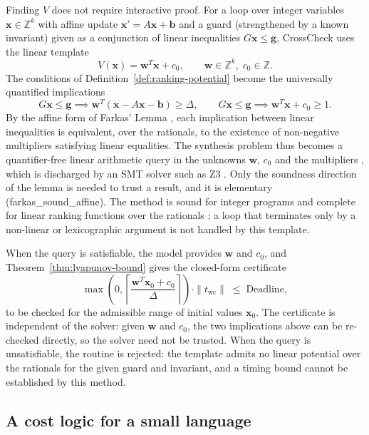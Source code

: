 \documentclass[oneside,english]{amsart}
\numberwithin{equation}{section}
\numberwithin{figure}{section}
\theoremstyle{plain}
\theoremstyle{definition}
\theoremstyle{plain}
\theoremstyle{remark}
\theoremstyle{plain}
\theoremstyle{definition}
\theoremstyle{plain}
\theoremstyle{remark}
\newcommand{\lean}[1]{{\ttfamily\small #1}}
\begin{document}
Finding $V$ does not require interactive proof. For a loop over integer variables $\mathbf{x} \in \mathbb{Z}^k$ with affine update $\mathbf{x}' = A\mathbf{x} + \mathbf{b}$ and a guard (strengthened by a known invariant) given as a conjunction of linear inequalities $G\mathbf{x} \le \mathbf{g}$, CrossCheck uses the linear template
\[
V(\mathbf{x}) = \mathbf{w}^T \mathbf{x} + c_0, \qquad \mathbf{w} \in \mathbb{Z}^k, \; c_0 \in \mathbb{Z}.
\]
The conditions of Definition~\ref{def:ranking-potential} become the universally quantified implications
\[
G\mathbf{x} \le \mathbf{g} \implies \mathbf{w}^T (\mathbf{x} - A\mathbf{x} - \mathbf{b}) \ge \Delta, \qquad G\mathbf{x} \le \mathbf{g} \implies \mathbf{w}^T \mathbf{x} + c_0 \ge 1 .
\]
By the affine form of Farkas' Lemma \cite{schrijver1986theory}, each implication between linear inequalities is equivalent, over the rationals, to the existence of non-negative multipliers satisfying linear equalities. The synthesis problem thus becomes a quantifier-free linear arithmetic query in the unknowns $\mathbf{w}$, $c_0$ and the multipliers \cite{colon2001synthesis,podelski2004complete}, which is discharged by an SMT solver such as Z3 \cite{demoura2008z3}. Only the soundness direction of the lemma is needed to trust a result, and it is elementary (\lean{farkas\_\allowbreak sound\_\allowbreak affine}). The method is sound for integer programs and complete for linear ranking functions over the rationals \cite{benamram2014ranking}; a loop that terminates only by a non-linear or lexicographic argument is not handled by this template.

When the query is satisfiable, the model provides $\mathbf{w}$ and $c_0$, and Theorem~\ref{thm:lyapunov-bound} gives the closed-form certificate
\[
\max\left(0, \left\lceil \frac{\mathbf{w}^T \mathbf{x}_0 + c_0}{\Delta} \right\rceil\right) \cdot \|t_{\text{wc}}\| \;\le\; \text{Deadline},
\]
to be checked for the admissible range of initial values $\mathbf{x}_0$. The certificate is independent of the solver: given $\mathbf{w}$ and $c_0$, the two implications above can be re-checked directly, so the solver need not be trusted. When the query is unsatisfiable, the routine is rejected: the template admits no linear potential over the rationals for the given guard and invariant, and a timing bound cannot be established by this method.

\subsection{A cost logic for a small language}
\label{subsec:cost-logic}
\end{document}

